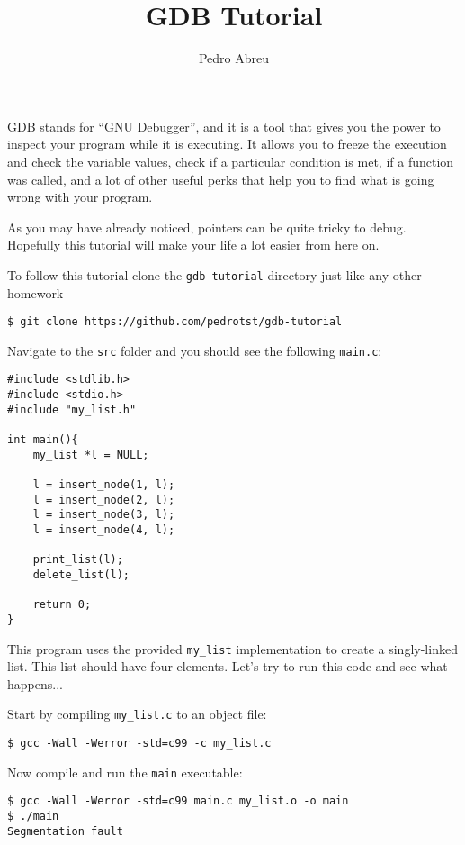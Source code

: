 \documentclass[11pt]{article}
\begin{document}
\title{GDB Tutorial}
\author{Pedro Abreu}
\maketitle

GDB stands for ``GNU Debugger'', and it is a tool that gives you the
power to inspect your program while it is executing. It allows you to
freeze the execution and check the variable values, check if a particular
condition is met, if a function was called, and a lot of other useful
perks that help you to find what is going wrong with your program.

As you may have already noticed, pointers can be quite tricky to
debug. Hopefully this tutorial will make your life a lot easier from
here on.

To follow this tutorial clone the {\tt gdb-tutorial} directory just like any
other homework
\begin{verbatim}
$ git clone https://github.com/pedrotst/gdb-tutorial
\end{verbatim}

Navigate to the {\tt src} folder and you should see the following {\tt main.c}:
\begin{verbatim}
#include <stdlib.h> 
#include <stdio.h> 
#include "my_list.h" 
 
int main(){ 
    my_list *l = NULL; 
 
    l = insert_node(1, l); 
    l = insert_node(2, l); 
    l = insert_node(3, l); 
    l = insert_node(4, l); 
 
    print_list(l); 
    delete_list(l); 
 
    return 0; 
}
\end{verbatim}

This program uses the provided {\tt my\_list} implementation to create
a singly-linked list. This list should have four elements. Let's try to
run this code and see what happens...

\clearpage

Start by compiling {\tt my\_list.c} to an object file:
\begin{verbatim}
$ gcc -Wall -Werror -std=c99 -c my_list.c
\end{verbatim}

Now compile and run the {\tt main} executable:
\begin{verbatim}
$ gcc -Wall -Werror -std=c99 main.c my_list.o -o main
$ ./main
Segmentation fault
\end{verbatim}
\end{document}
